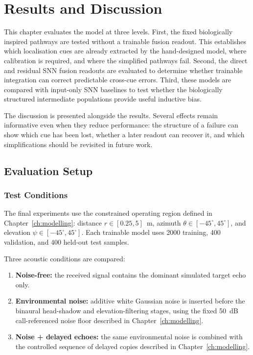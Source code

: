 \chapter{Results and Discussion} \label{ch:results}

This chapter evaluates the model at three levels. First, the fixed biologically inspired pathways are tested without a trainable fusion readout. This establishes which localisation cues are already extracted by the hand-designed model, where calibration is required, and where the simplified pathways fail. Second, the direct and residual SNN fusion readouts are evaluated to determine whether trainable integration can correct predictable cross-cue errors. Third, these models are compared with input-only SNN baselines to test whether the biologically structured intermediate populations provide useful inductive bias.

The discussion is presented alongside the results. Several effects remain informative even when they reduce performance: the structure of a failure can show which cue has been lost, whether a later readout can recover it, and which simplifications should be revisited in future work.

\section{Evaluation Setup}

\subsection{Test Conditions}

The final experiments use the constrained operating region defined in Chapter~\ref{ch:modelling}: distance $r \in [0.25,5]$~m, azimuth $\theta \in [-45^\circ,45^\circ]$, and elevation $\psi \in [-45^\circ,45^\circ]$. Each trainable model uses 2000 training, 400 validation, and 400 held-out test samples.

Three acoustic conditions are compared:
\begin{enumerate}
    \item \textbf{Noise-free:} the received signal contains the dominant simulated target echo only.
    \item \textbf{Environmental noise:} additive white Gaussian noise is inserted before the binaural head-shadow and elevation-filtering stages, using the fixed 50~dB call-referenced noise floor described in Chapter~\ref{ch:modelling}.
    \item \textbf{Noise + delayed echoes:} the same environmental noise is combined with the controlled sequence of delayed copies described in Chapter~\ref{ch:modelling}.
\end{enumerate}

